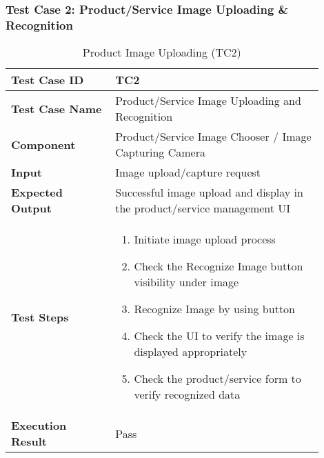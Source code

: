 \newpage
\begin{table}[h]
	\subsubsection{Test Case 2: Product/Service Image Uploading \& Recognition}
	\centering
	\caption{Product Image Uploading (TC2)}
	\begin{tabular}{|p{0.3\linewidth}|p{0.6\linewidth}|}
		\hline
		\textbf{Test Case ID} & TC2 \\
		\hline
		\textbf{Test Case Name} & Product/Service Image Uploading and Recognition \\
		\hline
		\textbf{Component} & Product/Service Image Chooser / Image Capturing Camera\\
		\hline
		\textbf{Input} & Image upload/capture request \\
		\hline
		\textbf{Expected Output} & Successful image upload and display in the product/service management UI \\
		\hline
		\textbf{Test Steps} & 
		\begin{enumerate}
			\item Initiate image upload process
			\item Check the Recognize Image button visibility under image
			\item Recognize Image by using button
			\item Check the UI to verify the image is displayed appropriately
			\item Check the product/service form to verify recognized data
		\end{enumerate} \\
		\hline
		\textbf{Execution Result} & Pass \\
		\hline
	\end{tabular}
\end{table}
\pagebreak

